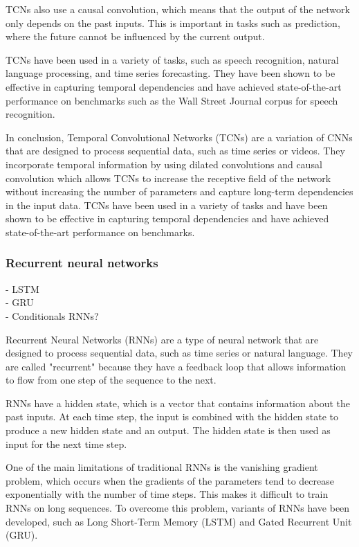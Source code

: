 TCNs also use a causal convolution, which means that the output of the network only depends on the past inputs. This is important in tasks such as prediction, where the future cannot be influenced by the current output.

TCNs have been used in a variety of tasks, such as speech recognition, natural language processing, and time series forecasting. They have been shown to be effective in capturing temporal dependencies and have achieved state-of-the-art performance on benchmarks such as the Wall Street Journal corpus for speech recognition.

In conclusion, Temporal Convolutional Networks (TCNs) are a variation of CNNs that are designed to process sequential data, such as time series or videos. They incorporate temporal information by using dilated convolutions and causal convolution which allows TCNs to increase the receptive field of the network without increasing the number of parameters and capture long-term dependencies in the input data. TCNs have been used in a variety of tasks and have been shown to be effective in capturing temporal dependencies and have achieved state-of-the-art performance on benchmarks.


\subsubsection{Recurrent neural networks}
- LSTM\\
- GRU\\
- Conditionals RNNs?

Recurrent Neural Networks (RNNs) are a type of neural network that are designed to process sequential data, such as time series or natural language. They are called "recurrent" because they have a feedback loop that allows information to flow from one step of the sequence to the next.

RNNs have a hidden state, which is a vector that contains information about the past inputs. At each time step, the input is combined with the hidden state to produce a new hidden state and an output. The hidden state is then used as input for the next time step.

One of the main limitations of traditional RNNs is the vanishing gradient problem, which occurs when the gradients of the parameters tend to decrease exponentially with the number of time steps. This makes it difficult to train RNNs on long sequences. To overcome this problem, variants of RNNs have been developed, such as Long Short-Term Memory (LSTM) and Gated Recurrent Unit (GRU).

